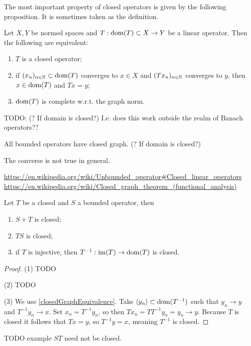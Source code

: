 The most important property of closed operators is given by the following proposition. It is sometimes taken as the definition.
\begin{proposition} \label{closedGraphEquivalence}
Let $X,Y$ be normed spaces and $T: \operatorname{dom}(T)\subset X \to Y$ be a linear operator. Then
the following are equivalent:
\begin{enumerate}
\item $T$ is a closed operator;
\item if $(x_n)_{n\in\mathbb{N}}\subset \operatorname{dom}(T)$ converges to $x\in X$ and $(Tx_n)_{n\in\mathbb{N}}$ converges to $y$, then $x\in\operatorname{dom}(T)$ and $Tx = y$;
\item $\operatorname{dom}(T)$ is complete w.r.t. the graph norm.
\end{enumerate}
\end{proposition}
TODO:  (? If domain is closed?) I.e. does this work outside the realm of Banach operators??
\begin{corollary}
All bounded operators have closed graph. (? If domain is closed?)
\end{corollary}
The converse is not true in general.

\url{https://en.wikipedia.org/wiki/Unbounded_operator#Closed_linear_operators}
\url{https://en.wikipedia.org/wiki/Closed_graph_theorem_(functional_analysis)}

\begin{proposition} \label{algebraClosedOperators}
Let $T$ be a closed and $S$ a bounded operator, then
\begin{enumerate}
\item $S+T$ is closed;
\item $TS$ is closed;
\item if $T$ is injective, then $T^{-1}: \operatorname{im}(T) \to \operatorname{dom}(T)$ is closed.
\end{enumerate}
\end{proposition}
\begin{proof}
(1) TODO

(2) TODO

(3) We use \ref{closedGraphEquivalence}. Take $\left\langle y_n \right\rangle\subset \operatorname{dom}(T^{-1})$ such that $y_n\to y$ and $T^{-1}y_n\to x$. Set $x_n = T^{-1}y_n$, so then $Tx_n = TT^{-1}y_n = y_n\to y$. Because $T$ is closed it follows that $Tx = y$, so $T^{-1}y = x$, meaning $T^{-1}$ is closed.
\end{proof}
TODO example $ST$ need not be closed.

